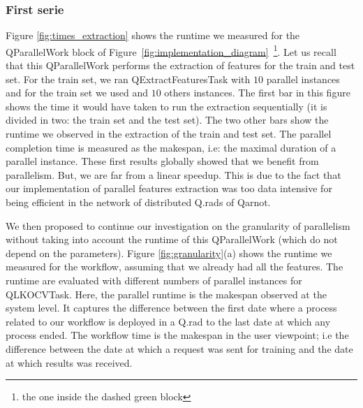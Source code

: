 \documentclass[10pt, conference, compsocconf]{IEEEtran}
\begin{document}
\subsubsection{First serie}

Figure \ref{fig:times_extraction} shows the runtime we measured for the QParallelWork block of 
Figure~\ref{fig:implementation_diagram}~\footnote{the one inside the dashed green block}. 
Let us recall that this QParallelWork performs the extraction of features for the train and test set. 
For the train set, we ran QExtractFeaturesTask with $10$ parallel instances and for the train set we used and $10$ others instances. 
The first bar in this figure shows the time it would have taken to run the extraction sequentially (it is divided in two: the train set and the test set). The two other bars show the runtime we observed in the extraction of the train and test set. The parallel completion time is measured as the makespan, i.e: the maximal duration of a parallel instance.
These first results globally showed that we benefit from parallelism. 
But, we are far from a linear speedup. This is due to the fact that our implementation of parallel features extraction 
was too data intensive for being efficient in the network of distributed Q.rads of Qarnot. 

We then proposed to continue our investigation on the granularity of parallelism without taking into account the runtime 
of this QParallelWork (which do not depend on the parameters). Figure \ref{fig:granularity}(a) shows the runtime we measured for the workflow, assuming that we already 
had all the features. The runtime are evaluated  with different numbers of parallel instances for QLKOCVTask. Here, the parallel runtime 
is the makespan observed at the system level. It captures the difference between the first date where a process related to our 
workflow is deployed in a Q.rad to the last date at which any process ended. 
The workflow time is the makespan in the user viewpoint; i.e the difference between the date at which a request was sent for training 
and the date at which results was received. 
\end{document}

